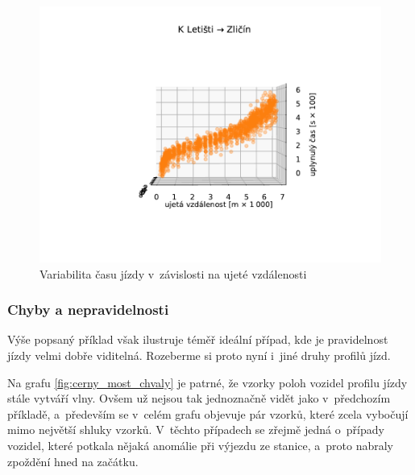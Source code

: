 \begin{figure}
\centering
  \includegraphics[width=\linewidth]{../img/dojezd_podle_vzdalenosti}
  \caption{Variabilita času jízdy v~závislosti na ujeté vzdálenosti}
  \label{fig:dojezd_podle_vzdalenosti}
\end{figure}

\subsubsection{Chyby a nepravidelnosti}

Výše popsaný příklad však ilustruje téměř ideální případ, kde je pravidelnost jízdy velmi dobře viditelná. Rozeberme si proto nyní i~jiné druhy profilů jízd.


\bigbreak

Na grafu \ref{fig:cerny_most_chvaly} je patrné, že vzorky poloh vozidel profilu jízdy stále vytváří vlny. Ovšem už nejsou tak jednoznačně vidět jako v~předchozím příkladě, a~především se v~celém grafu objevuje pár vzorků, které zcela vybočují mimo největší shluky vzorků. V~těchto případech se zřejmě jedná o~případy vozidel, které potkala nějaká anomálie při výjezdu ze stanice, a~proto nabraly zpoždění hned na začátku.


